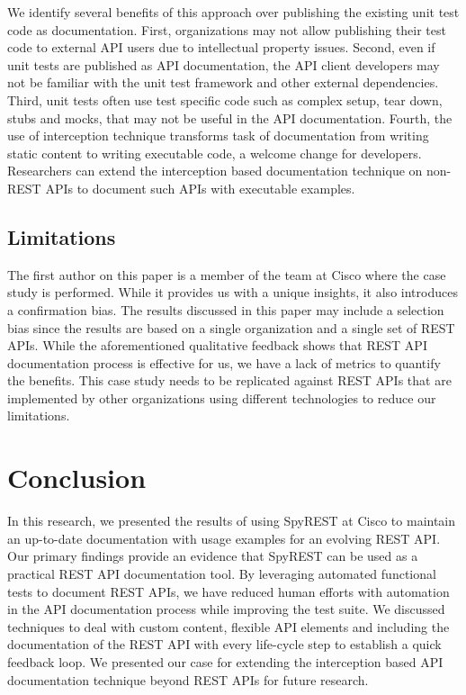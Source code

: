 \documentclass[10pt, conference]{IEEEtran}
\begin{document}
We identify several benefits of this approach over publishing the existing unit test code as documentation. First, organizations may not allow publishing their test code to external API users due to intellectual property issues. Second, even if unit tests are published as API documentation, the API client developers may not be familiar with the unit test framework and other external dependencies. Third, unit tests often use test specific code such as complex setup, tear down, stubs and mocks, that may not be useful in the API documentation. Fourth, the use of interception technique transforms task of documentation from writing static content to writing executable code, a welcome change for developers. Researchers can extend the interception based documentation technique on non-REST APIs to document such APIs with executable examples.

\subsection{Limitations} %

The first author on this paper is a member of the team at Cisco where the case study is performed. While it provides us with a unique insights, it also introduces a confirmation bias. The results discussed in this paper may include a selection bias since the results are based on a single organization and a single set of REST APIs. While the aforementioned qualitative feedback shows that REST API documentation process is effective for us, we have a lack of metrics to quantify the benefits. This case study needs to be replicated against REST APIs that are implemented by other organizations using different technologies to reduce our limitations.

\section{Conclusion}
In this research, we presented the results of using SpyREST at Cisco to maintain an up-to-date documentation with usage examples for an evolving REST API. Our primary findings provide an evidence that SpyREST can be used as a practical REST API documentation tool. By leveraging automated functional tests to document REST APIs, we have reduced human efforts with automation in the API documentation process while improving the test suite. We discussed techniques to deal with custom content, flexible API elements and including the documentation of the REST API with every life-cycle step to establish a quick feedback loop. We presented our case for extending the interception based API documentation technique beyond REST APIs for future research.
\end{document}

